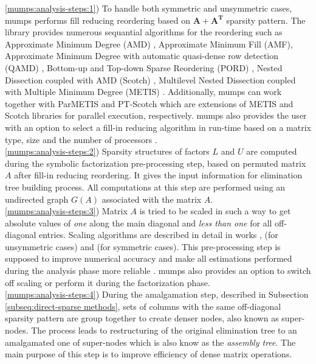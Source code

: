 \ref{mumps:analysis-steps:1}) To handle both symmetric and unsymmetric cases, \acrshort{mumps} performs fill reducing reordering based on $\boldsymbol{A} + \boldsymbol{A^T}$ sparsity pattern. The library provides numerous sequantial algorithms for the reordering such as Approximate Minimum Degree (AMD) \cite{reordering:AMD}, Approximate Minimum Fill (AMF), Approximate Minimum Degree with automatic quasi-dense row detection (QAMD) \cite{reordering:QAMD}, Bottom-up and Top-down Sparse Reordering (PORD) \cite{reordering:PORD}, Nested Dissection coupled with AMD (Scotch) \cite{reordering:SCOTCH}, Multilevel Nested Dissection coupled with Multiple Minimum Degree (METIS) \cite{reordering:METIS}. Additionally, \acrshort{mumps} can work together with ParMETIS and PT-Scotch which are extensions of METIS and Scotch libraries for parallel execution, respectively. \acrshort{mumps} also provides the user with an option to select a fill-in reducing algorithm in run-time based on a matrix type, size and the number of processors \cite{mumps-manual}.\\


\ref{mumps:analysis-steps:2}) Sparsity structures of factors $L$ and $U$ are computed during the symbolic factorization pre-processing step, based on permuted matrix $A$ after fill-in reducing reordering. It gives the input information for elimination tree building process.  All computations at this step are performed using an undirected graph $G(A)$ associated with the matrix $A$.\\


\ref{mumps:analysis-steps:3}) Matrix $A$ is tried to be scaled in such a way to get absolute values of \textit{one} along the main diagonal and \textit{less than one} for all off-diagonal entries. Scaling algorithms are described in detail in works \cite{mm:scaling:duff1999design}, \cite{mm:scaling:duff2001algorithms} (for  unsymmetric cases) and \cite{mm:scaling:duff2005strategies} (for  symmetric cases). This pre-processing step is supposed to improve numerical accuracy and make all estimations performed during the analysis phase more reliable \cite{mumps-manual}. \acrshort{mumps} also provides an option to switch off scaling or perform it during the factorization phase.\\



\ref{mumps:analysis-steps:4}) During the  amalgamation step, described in Subsection \ref{subseq:direct-sparse methods}, sets of columns with the same off-diagonal sparsity pattern are group together to create denser nodes, also known as super-nodes. The process leads to restructuring of the original elimination tree to an amalgamated one of super-nodes which is also know as the \textit{assembly tree}. The main purpose of this step is to improve efficiency of dense matrix operations.\\



